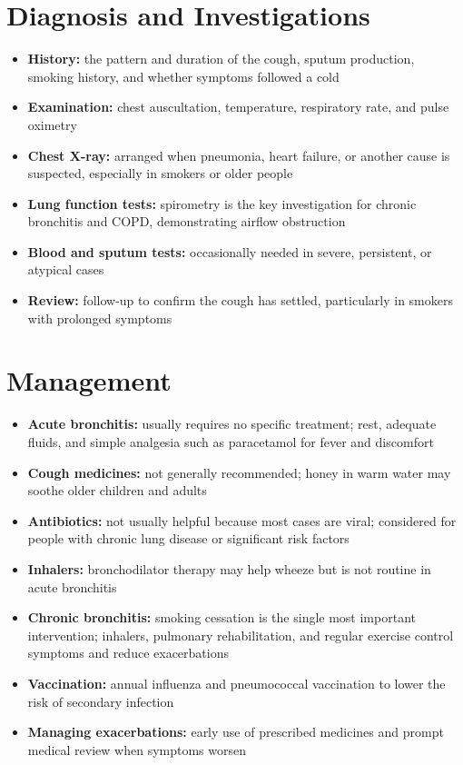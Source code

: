 \section*{Diagnosis and Investigations}
\begin{itemize}
    \item \textbf{History:} the pattern and duration of the cough, sputum production, smoking history, and whether symptoms followed a cold
    \item \textbf{Examination:} chest auscultation, temperature, respiratory rate, and pulse oximetry
    \item \textbf{Chest X-ray:} arranged when pneumonia, heart failure, or another cause is suspected, especially in smokers or older people
    \item \textbf{Lung function tests:} spirometry is the key investigation for chronic bronchitis and COPD, demonstrating airflow obstruction
    \item \textbf{Blood and sputum tests:} occasionally needed in severe, persistent, or atypical cases
    \item \textbf{Review:} follow-up to confirm the cough has settled, particularly in smokers with prolonged symptoms
\end{itemize}

\section*{Management}
\begin{itemize}
    \item \textbf{Acute bronchitis:} usually requires no specific treatment; rest, adequate fluids, and simple analgesia such as paracetamol for fever and discomfort
    \item \textbf{Cough medicines:} not generally recommended; honey in warm water may soothe older children and adults
    \item \textbf{Antibiotics:} not usually helpful because most cases are viral; considered for people with chronic lung disease or significant risk factors
    \item \textbf{Inhalers:} bronchodilator therapy may help wheeze but is not routine in acute bronchitis
    \item \textbf{Chronic bronchitis:} smoking cessation is the single most important intervention; inhalers, pulmonary rehabilitation, and regular exercise control symptoms and reduce exacerbations
    \item \textbf{Vaccination:} annual influenza and pneumococcal vaccination to lower the risk of secondary infection
    \item \textbf{Managing exacerbations:} early use of prescribed medicines and prompt medical review when symptoms worsen
\end{itemize}

